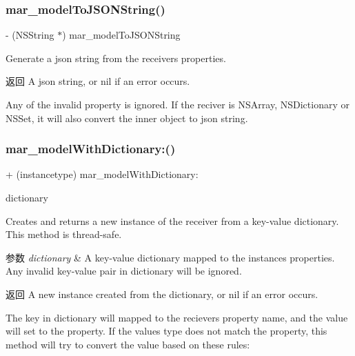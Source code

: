 \subsubsection{\texorpdfstring{mar\+\_\+model\+To\+J\+S\+O\+N\+String()}{mar\_modelToJSONString()}}
{\footnotesize\ttfamily -\/ (N\+S\+String $\ast$) mar\+\_\+model\+To\+J\+S\+O\+N\+String \begin{DoxyParamCaption}{ }\end{DoxyParamCaption}}

Generate a json string from the receiver\textquotesingle{}s properties.

\begin{DoxyReturn}{返回}
A json string, or nil if an error occurs.
\end{DoxyReturn}
Any of the invalid property is ignored. If the reciver is {\ttfamily N\+S\+Array}, {\ttfamily N\+S\+Dictionary} or {\ttfamily N\+S\+Set}, it will also convert the inner object to json string. \mbox{\label{category_n_s_object_07_m_a_r_model_08_a4ce4c4b651072409b7feca71a77d2ed3}} 
\subsubsection{\texorpdfstring{mar\+\_\+model\+With\+Dictionary\+:()}{mar\_modelWithDictionary:()}}
{\footnotesize\ttfamily + (instancetype) mar\+\_\+model\+With\+Dictionary\+: \begin{DoxyParamCaption}\item[{(N\+S\+Dictionary $\ast$)}]{dictionary }\end{DoxyParamCaption}}

Creates and returns a new instance of the receiver from a key-\/value dictionary. This method is thread-\/safe.


\begin{DoxyParams}{参数}
{\em dictionary} & A key-\/value dictionary mapped to the instance\textquotesingle{}s properties. Any invalid key-\/value pair in dictionary will be ignored.\\
\hline
\end{DoxyParams}
\begin{DoxyReturn}{返回}
A new instance created from the dictionary, or nil if an error occurs.
\end{DoxyReturn}
The key in {\ttfamily dictionary} will mapped to the reciever\textquotesingle{}s property name, and the value will set to the property. If the value\textquotesingle{}s type does not match the property, this method will try to convert the value based on these rules\+:

